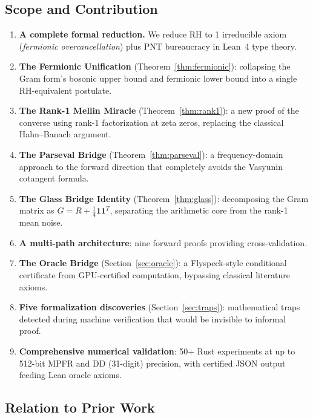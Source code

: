 \documentclass[11pt,a4paper]{article}
\begin{document}
\subsection{Scope and Contribution}

\begin{enumerate}
  \item \textbf{A complete formal reduction.} We reduce RH to 1
    irreducible axiom (\emph{fermionic overcancellation}) plus
    PNT bureaucracy in Lean~4 type theory.
  \item \textbf{The Fermionic Unification}
    (Theorem~\ref{thm:fermionic}): collapsing the Gram form's
    bosonic upper bound and fermionic lower bound into a single
    RH-equivalent postulate.
  \item \textbf{The Rank-1 Mellin Miracle} (Theorem~\ref{thm:rank1}):
    a new proof of the converse using rank-1 factorization at zeta
    zeros, replacing the classical Hahn--Banach argument.
  \item \textbf{The Parseval Bridge} (Theorem~\ref{thm:parseval}):
    a frequency-domain approach to the forward direction that
    completely avoids the Vasyunin cotangent formula.
  \item \textbf{The Glass Bridge Identity}
    (Theorem~\ref{thm:glass}): decomposing the Gram matrix as
    $G = R + \frac{1}{4}\mathbf{1}\mathbf{1}^T$, separating
    the arithmetic core from the rank-1 mean noise.
  \item \textbf{A multi-path architecture}: nine forward
    proofs providing cross-validation.
  \item \textbf{The Oracle Bridge} (Section~\ref{sec:oracle}):
    a Flyspeck-style conditional certificate from GPU-certified
    computation, bypassing classical literature axioms.
  \item \textbf{Five formalization discoveries}
    (Section~\ref{sec:traps}): mathematical traps detected during
    machine verification that would be invisible to informal proof.
  \item \textbf{Comprehensive numerical validation}: 50+ Rust
    experiments at up to 512-bit MPFR and DD (31-digit) precision,
    with certified JSON output feeding Lean oracle axioms.
\end{enumerate}

\subsection{Relation to Prior Work}
\end{document}
